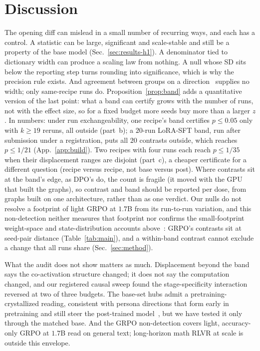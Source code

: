 \documentclass{article}
\begin{document}
\section{Discussion}
\label{sec:discussion}
The opening diff can mislead in a small number of recurring ways, and each has a control. A statistic can be large, significant and scale-stable and still be a property of the base model (Sec.~\ref{sec:results-h1}). A denominator tied to dictionary width can produce a scaling law from nothing. A null whose SD sits below the reporting step turns rounding into significance, which is why the precision rule exists. And agreement between groups on a direction~\citep{shi2026rl_generalize,rojasnunez2026forgetting} supplies no width; only same-recipe runs do. Proposition~\ref{prop:band} adds a quantitative version of the last point: what a band can certify grows with the number of runs, not with the effect size, so for a fixed budget more seeds buy more than a larger $z$. In numbers: under run exchangeability, one recipe's band certifies $p\le0.05$ only with $k\ge19$ reruns, all outside (part~b); a $20$-run LoRA-SFT band, run after submission under a registration, puts all $20$ contrasts outside, which reaches $p\le1/21$ (App.~\ref{app:build}). Two recipes with four runs each reach $p\le1/35$ when their displacement ranges are disjoint (part~c), a cheaper certificate for a different question (recipe versus recipe, not base versus post). Where contrasts sit at the band's edge, as DPO's do, the count is fragile (it moved with the GPU that built the graphs), so contrast and band should be reported per dose, from graphs built on one architecture, rather than as one verdict. Our nulls do not resolve a footprint of light GRPO at $1.7$B from its run-to-run variation, and this non-detection neither measures that footprint nor confirms the small-footprint weight-space and state-distribution accounts above~\citep{relex_rank1_rlvr2026,posttraining_states_not_tokens2026}: GRPO's contrasts sit at seed-pair distance (Table~\ref{tab:main}), and a within-band contrast cannot exclude a change that all runs share (Sec.~\ref{sec:method}).

What the audit does not show matters as much. Displacement beyond the band says the co-activation structure changed; it does not say the computation changed, and our registered causal sweep found the stage-specificity interaction reversed at two of three budgets. The base-set hubs admit a pretraining-crystallized reading, consistent with persona directions that form early in pretraining and still steer the post-trained model~\citep{moskvoretskii2026persona}, but we have tested it only through the matched base. And the GRPO non-detection covers light, accuracy-only GRPO at $1.7$B read on general text; long-horizon math RLVR at scale is outside this envelope.
\end{document}
